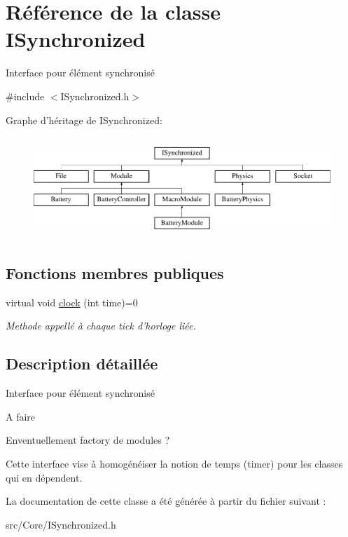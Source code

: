 \hypertarget{classISynchronized}{\section{Référence de la classe I\-Synchronized}
\label{classISynchronized}
}


Interface pour élément synchronisé  




{\ttfamily \#include $<$I\-Synchronized.\-h$>$}

Graphe d'héritage de I\-Synchronized\-:\begin{figure}[H]
\begin{center}
\leavevmode
\includegraphics[height=3.862069cm]{classISynchronized}
\end{center}
\end{figure}
\subsection*{Fonctions membres publiques}
\begin{DoxyCompactItemize}
\item 
\hypertarget{classISynchronized_af7155c662758d6c70f381bb9b11afcd6}{virtual void \hyperlink{classISynchronized_af7155c662758d6c70f381bb9b11afcd6}{clock} (int time)=0}\label{classISynchronized_af7155c662758d6c70f381bb9b11afcd6}

\begin{DoxyCompactList}\small\item\em Methode appellé à chaque tick d'horloge liée. \end{DoxyCompactList}\end{DoxyCompactItemize}


\subsection{Description détaillée}
Interface pour élément synchronisé 

\begin{DoxyRefDesc}{A faire}
\item[\hyperlink{todo__todo000006}{A faire}]Enventuellement factory de modules ? \end{DoxyRefDesc}


Cette interface vise à homogénéiser la notion de temps (timer) pour les classes qui en dépendent. 

La documentation de cette classe a été générée à partir du fichier suivant \-:\begin{DoxyCompactItemize}
\item 
src/\-Core/I\-Synchronized.\-h\end{DoxyCompactItemize}
